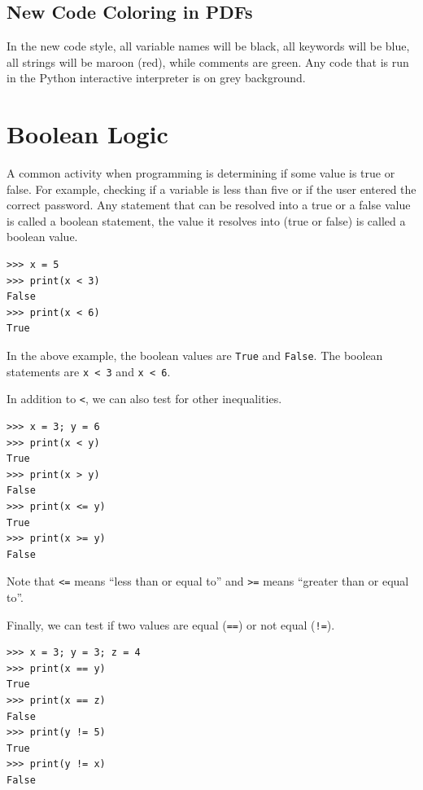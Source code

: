\documentclass[11pt]{cselabheader}
\begin{document}
\subsection{New Code Coloring in PDFs}

In the new code style, all variable names will be black, all keywords will be
blue, all strings will be maroon (red), while comments are green. Any code that
is run in the Python interactive interpreter is on grey background.


\pagebreak
\section{Boolean Logic}

A common activity when programming is determining if some value is true or
false. For example, checking if a variable is less than five or if the user
entered the correct password. Any statement that can be resolved into a true or
a false value is called a boolean statement, the value it resolves into (true or
false) is called a boolean value.

\begin{lstlisting}[style=ipython]
>>> x = 5
>>> print(x < 3)
False
>>> print(x < 6)
True
\end{lstlisting}

In the above example, the boolean values are \lstinline{True} and
\lstinline{False}. The boolean statements are \lstinline{x < 3} and 
\lstinline{x < 6}. 

In addition to \lstinline{<}, we can also test for other
inequalities.
\begin{lstlisting}[style=ipython]
>>> x = 3; y = 6
>>> print(x < y)
True
>>> print(x > y)
False
>>> print(x <= y)
True
>>> print(x >= y)
False
\end{lstlisting}

Note that \lstinline{<=} means ``less than or equal to'' and \lstinline{>=}
means ``greater than or equal to''. 

Finally, we can test if two values are equal
(\lstinline{==}) or not equal (\lstinline{!=}).
\begin{lstlisting}[style=ipython]
>>> x = 3; y = 3; z = 4
>>> print(x == y)
True
>>> print(x == z)
False
>>> print(y != 5)
True
>>> print(y != x)
False
\end{lstlisting}
\end{document}
